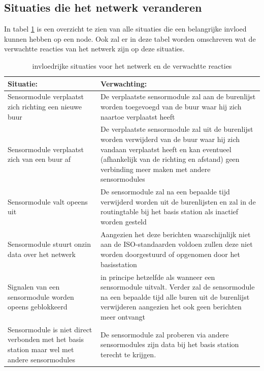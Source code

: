 \documentclass[a4paper, 11pt]{article}
\begin{document}
\newpage
\subsection{Situaties die het netwerk veranderen} \label{SituatieOmschrijving}
In tabel \ref{Situaties} is een overzicht te zien van alle situaties die een belangrijke invloed kunnen hebben op een node. Ook zal er in deze tabel worden omschreven wat de verwachtte reacties van het netwerk zijn op deze situaties.
\begin{table}[ht]
	\centering
	\caption{invloedrijke situaties voor het netwerk en de verwachtte reacties}
	\begin{tabular}{ | m{6cm} | m{6cm}| }
		\hline
		\textbf{Situatie:} & \textbf{Verwachting:} \\
		\hline
		Sensormodule verplaatst zich richting een nieuwe buur & De verplaatste sensormodule zal aan de burenlijst worden toegevoegd van de buur waar hij zich naartoe verplaatst heeft
		\\
		\hline
		Sensormodule verplaatst zich van een buur af & De verplaatste sensormodule zal uit de burenlijst worden verwijderd van de buur waar hij zich vandaan verplaatst heeft en kan eventueel (afhankelijk van de richting en afstand) geen verbinding meer maken met andere sensormodules
		\\
		\hline
		Sensormodule valt opeens uit  & De sensormodule zal na een bepaalde tijd verwijderd worden uit de burenlijsten en zal in de routingtable bij het basis station als inactief worden gesteld
		\\
		\hline
		Sensormodule stuurt onzin data over het netwerk & Aangezien het deze berichten waarschijnlijk niet aan de ISO-standaarden voldoen zullen deze niet worden doorgestuurd of opgenomen door het basisstation
		\\
		\hline
		Signalen van een sensormodule worden opeens geblokkeerd & in principe hetzelfde als wanneer een sensormodule uitvalt. Verder zal de sensormodule na een bepaalde tijd alle buren uit de burenlijst verwijderen aangezien het ook geen berichten meer ontvangt
		\\
		\hline
		Sensormodule is niet direct verbonden met het basis station maar wel met andere sensormodules & De sensormodule zal proberen via andere sensormodules zijn data bij het basis station terecht te krijgen.
		\\
		\hline
	\end{tabular}
	\label{Situaties}
\end{table}
\end{document}

